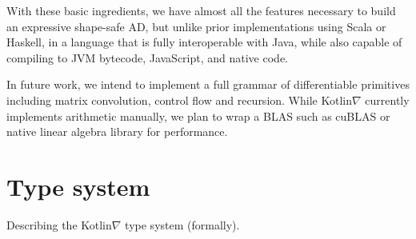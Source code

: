 \documentclass[12pt,initial,twoside,maitrise]{dms}
\numberwithin{equation}{section}
\numberwithin{table}{chapter}
\numberwithin{figure}{chapter}
\begin{document}
With these basic ingredients, we have almost all the features necessary to build an expressive shape-safe AD, but unlike prior implementations using Scala or Haskell, in a language that is fully interoperable with Java, while also capable of compiling to JVM bytecode, JavaScript, and native code.

In future work, we intend to implement a full grammar of differentiable primitives including matrix convolution, control flow and recursion. While Kotlin$\nabla$ currently implements arithmetic manually, we plan to wrap a BLAS such as cuBLAS or native linear algebra library for performance.

\section{Type system}\label{sec:type-system}

Describing the Kotlin$\nabla$ type system (formally).
\end{document}

